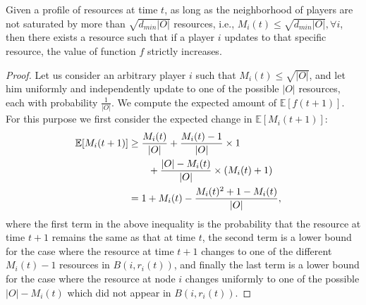 \smallskip
\begin{theorem}\label{thm:randomization}
Given a profile of resources at time $t$, as long as the neighborhood of players are not saturated by more than $\sqrt{d_{min}|O|}$ resources, i.e., $M_i(t)\leq \sqrt{d_{min}|O|}, \forall i$, then there exists a resource such that if a player $i$ updates to that specific resource, the value of function $f$ strictly increases.
\end{theorem}
\begin{proof}  
Let us consider an arbitrary player $i$ such that $M_i(t)\leq \sqrt{|O|}$, and let him uniformly and independently update to one of the possible $|O|$ resources, each with probability $\frac{1}{|O|}$. We compute the expected amount of $\mathbb{E}[f(t+1)]$. For this purpose we first consider the expected change in $\mathbb{E}[M_i(t+1)]$:  
\begin{align}\nonumber
\mathbb{E}[M_i(t+1)]&\ge \frac{M_i(t)}{|O|}+\frac{M_i(t)-1}{|O|}\times 1\cr 
&\qquad+\frac{|O|-M_i(t)}{|O|}\times (M_i(t)+1)\cr 
&=1+M_i(t)-\frac{M_i(t)^2+1-M_i(t)}{|O|},
\end{align}
where the first term in the above inequality is the probability that the resource at time $t+1$ remains the same as that at time $t$, the second term is a lower bound for the case where the resource at time $t+1$ changes to one of the different $M_i(t)-1$ resources in $B(i,r_i(t))$, and finally the last term is a lower bound for the case where the resource at node $i$ changes uniformly to one of the possible $|O|-M_i(t)$ which did not appear in $B(i,r_i(t))$.


\end{proof}
